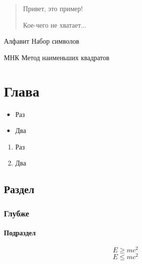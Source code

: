\documentclass[12pt, rusmathsym]{nirreport}
\begin{document}
\titlepage

\begin{abstract}
  Привет, это пример!

  Кое-чего не хватает...
\end{abstract}

\begin{executors}
\end{executors}

\tableofcontents

\begin{nirdefslist}
  \item[Алфавит] Набор символов
\end{nirdefslist}

\begin{nirabbrlist}
  \item[МНК] Метод наименьших квадратов
\end{nirabbrlist}

\chapter{Глава}

\begin{itemize}
\item Раз
\item Два
\end{itemize}

\begin{enumerate}
\item Раз
\item Два
\end{enumerate}

\lipsum[1]

\section{Раздел}

\lipsum[1]

\subsection{Глубже}

\lipsum[1]

\subsubsection{Подраздел}

\lipsum[1]
\begin{equation}
  E \geq mc^2
\end{equation}
\begin{equation}
  E \leq mc^2
\end{equation}
\lipsum[1]
\end{document}
